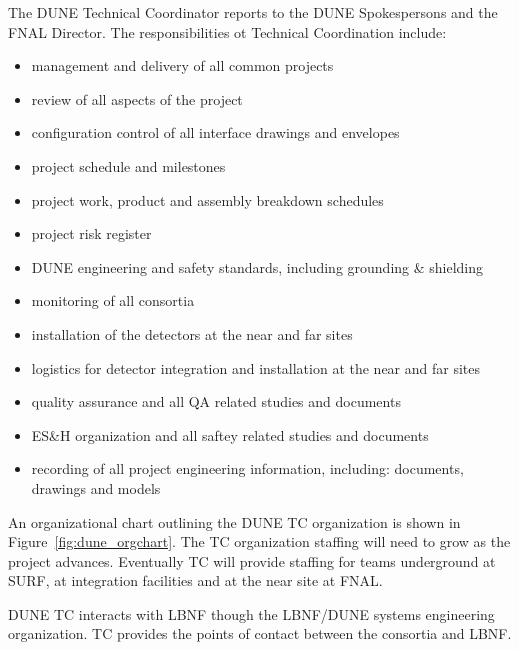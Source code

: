 The DUNE Technical Coordinator reports to the DUNE Spokespersons and the
FNAL Director. The responsibilities ot Technical Coordination include:
\begin{itemize}
  \item management and delivery of all common projects
  \item review of all aspects of the project
  \item configuration control of all interface drawings and envelopes
  \item project schedule and milestones
  \item project work, product and assembly breakdown schedules
  \item project risk register
  \item DUNE engineering and safety standards, including grounding \& shielding
  \item monitoring of all consortia
  \item installation of the detectors at the near and far sites
  \item logistics for detector integration and installation at the near and far sites
  \item quality assurance and all QA related studies and documents
  \item ES\&H organization and all saftey related studies and documents
  \item recording of all project engineering information, including: documents, drawings and models
\end {itemize}

An organizational chart outlining the DUNE TC organization is shown in
Figure~\ref{fig:dune_orgchart}. The TC organization staffing will need
to grow as the project advances. Eventually TC will provide staffing
for teams underground at SURF, at integration facilities and at the
near site at FNAL.

DUNE TC interacts with LBNF though the LBNF/DUNE systems engineering
organization. TC provides the points of contact between the consortia
and LBNF.
    




